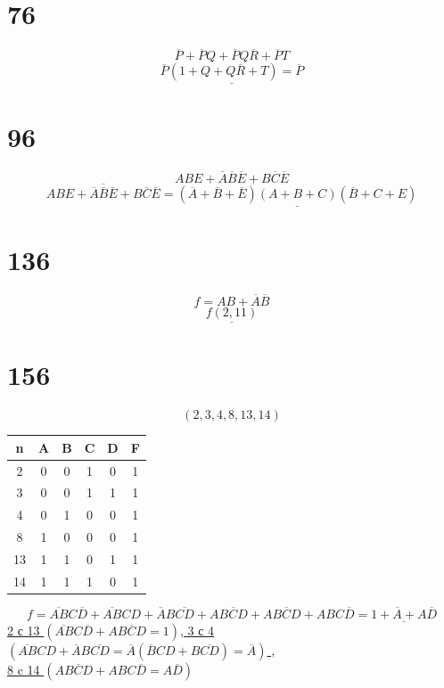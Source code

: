 \documentclass[a4paper, 12pt]{article}
\begin{document}
\section*{76}
\[
       \overline{P} + \overline{P}Q + \overline{P}Q\overline{R} + \overline{P}T
\]
\[
       \underline{\overline{P}(1 + Q + Q\overline{R} + T) = \overline{P}}
\]
\section*{96}
\[
    ABE + \overline{A}\overline{B}\overline{E} + B\overline{C}\overline{E}       
\]
\[
    \overline{ABE + \overline{A}\overline{B}\overline{E} + B\overline{C}\overline{E}} = \underline{(\overline{A}+\overline{B}+\overline{E})(A + B + C)(\overline{B} + C + E)}
\]

\section*{136}
\[
       f = AB + \overline{A} \overline{B}
\]
\[
       \underline{f(2,11)}
\]
\section*{156}
\[
       (2,3,4,8,13,14)
\]
\begin{center}
       \begin{tabular}{| c | c c c c | c|} 
       \hline
       n & A & B & C & D & F \\ 
       \hline
       2 & 0 & 0 & 1 & 0 & 1 \\ 
       \hline
       3 & 0 & 0 & 1 & 1 & 1 \\
       \hline
       4 & 0 & 1 & 0 & 0 & 1 \\
       \hline
       8 & 1 & 0 & 0 & 0 & 1 \\
       \hline
       13 & 1 & 1 & 0 & 1 & 1 \\
       \hline
       14 & 1 & 1 & 1 & 0 & 1 \\
       \hline
      \end{tabular}
\end{center}
\[
       f = \overline{AB}C\overline{D} + \overline{AB}CD + \overline{A}B\overline{CD} + A\overline{BCD} + AB\overline{C}D + ABC\overline{D} = \underline{1 + \overline{A} + A\overline{D}}
\]
\underline{2 с 13 $ (\overline{AB}C\overline{D} + AB\overline{C}D = 1)$, 3 с 4 $ (\overline{AB}CD + \overline{A}B\overline{CD} = \overline{A}(\overline{B}CD + B\overline{CD}) = \overline{A}) $
,}\\ \underline{8 c 14 $ (A\overline{BCD} + ABC\overline{D} = A\overline{D}) $}
\end{document}
